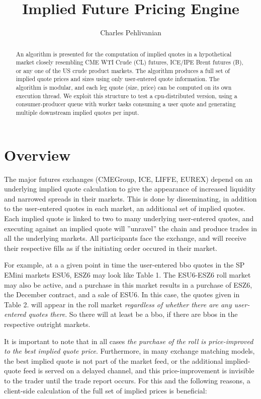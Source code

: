 \documentclass{article}
\begin{document}
\title{Implied Future Pricing Engine}
\author{Charles Pehlivanian}

\maketitle

\begin{abstract}

An algorithm is presented for the computation of implied quotes in a hypothetical market closely resembling CME WTI Crude (CL) futures, ICE/IPE Brent futures (B), or any one of the US crude product markets. The algorithm produces a full set of implied quote prices and sizes using only user-entered quote information. The algorithm is modular, and each leg quote (size, price) can be computed on its own execution thread. We exploit this structure to test a cpu-distributed version, using a consumer-producer queue with worker tasks consuming a user quote and generating multiple downstream implied quotes per input. 
\end{abstract}

\section*{Overview}
The major futures exchanges (CMEGroup, ICE, LIFFE, EUREX) depend on an underlying implied quote calculation to give the appearance of increased liquidity and narrowed spreads in their markets. This is done by disseminating, in addition to the user-entered quotes in each market, an additional set of implied quotes. Each implied quote is linked to two to many underlying user-entered quotes, and executing against an implied quote will ''unravel'' the chain and produce trades in all the underlying markets.  All participants face the exchange, and will receive their respective fills as if the initiating order occured in their market.

For example, at a a given point in time the user-entered bbo quotes in the SP EMini markets ESU6, ESZ6 may look like Table 1. The ESU6-ESZ6 roll market may also be active, and a purchase in this market results in a purchase of ESZ6, the December contract, and a sale of ESU6. In this case, the quotes given in Table 2. will appear in the roll market {\it regardless of whether there are any user-entered quotes there}. So there will at least be a bbo, if there are bbos in the respective outright markets. 


It is important to note that in all cases {\it the purchase of the roll is price-improved to the best implied quote price}. Furthermore, in many exchange matching models, the best implied quote is not part of the market feed, or the additional implied-quote feed is served on a delayed channel, and this price-improvement is invisible to the trader until the trade report occurs. For this and the following reasons, a client-side calculation of the full set of implied prices is beneficial:
\end{document}
